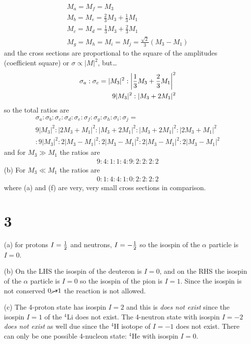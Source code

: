 \documentclass[../main.tex]{subfiles}
\begin{document}
\begin{align*}
    M_a = M_f = M_3 \\
    M_b = M_e = \frac{2}{3} M_3 + \frac{1}{3} M_1 \\
    M_c = M_d = \frac{1}{3} M_3 + \frac{2}{3} M_1 \\
    M_g = M_h = M_i = M_j = \frac{\sqrt{2}}{3} (M_3 - M_1)
\end{align*}
and the cross sections are proportional to the square of the amplitudes (coefficient square) or 
$\sigma \propto |M|^2$, but\dots
\begin{align*}
    \sigma_a : \sigma_c = |M_3|^2 : \abs{\frac{1}{3}M_3 + \frac{2}{3} M_1}^2 \\
    9 |M_3|^2 : |M_3 + 2 M_1|^2
\end{align*}
so the total ratios are
\begin{align*}
    \sigma_a : \sigma_b : \sigma_c : \sigma_d : \sigma_e :
        \sigma_f : \sigma_g : \sigma_h : \sigma_i : \sigma_j = \\
    9|M_3|^2 : |2M_3 + M_1|^2 : |M_3 + 2M_1|^2 : |M_3 + 2M_1|^2 : |2M_3 + M_1|^2 \\
    :  9|M_3|^2 : 2|M_3 - M_1|^2 : 2|M_3 - M_1|^2 : 2|M_3 - M_1|^2 : 2|M_3 - M_1|^2
\end{align*}
and for $M_3 \gg M_1$ the ratios are
\begin{align*}
    \boxed{9 : 4 : 1 : 1 : 4 : 9 : 2 : 2 : 2 : 2}
\end{align*}
(b) For $M_3 \ll M_1$ the ratios are
\begin{align*}
    \boxed{0 : 1 : 4 : 4 : 1 : 0 : 2 : 2 : 2 : 2}
\end{align*}
where (a) and (f) are very, very small cross sections in comparison.
\section*{3}
(a) for protons $I = \frac{1}{2}$ and neutrons, $I = -\frac{1}{2}$ so the isospin of the $\alpha$ particle is
$I = 0$.

(b) On the LHS the isospin of the deuteron is $I = 0$, and on the RHS the isospin of the $\alpha$
particle is $I = 0$ so the isospin of the pion is $I = 1$. Since the isospin is not conserved $0 \cancel \to 1$ 
the reaction is not allowed.

(c) The 4-proton state has isospin $I = 2$ and this is \emph{does not exist} since the isospin $I=1$ of the
$^4$Li does not exist. The 4-neutron state with isospin $I = -2$ \emph{does not exist} as well due 
since the $^4$H isotope of $I = -1$ does not exist. There can only be one possible 4-nucleon state:
$^4$He with isospin $I = 0$.
\end{document}
